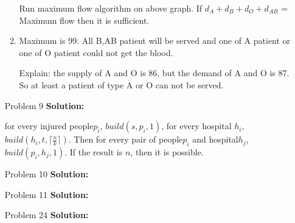 \normalfont\documentclass[letterpaper,11pt]{article}
\begin{document}
\begin{enumerate}
\begin{enumerate}
	Run maximum flow algorithm on above graph. If $d_A+d_B+d_O+d_{AB}$ = Maximum flow then it is sufficient.
	\item
		Maximum is 99. All B,AB patient will be served and one of A patient or one of O patient could not get the blood.\par
		Explain:
		the supply of A and O is 86, but the demand of A and O is 87. So at least a patient of type A or O can not be served.
	\end{enumerate}
\item [Problem 9]\textbf{Solution:}\par
	for every injured people$p_i$, $build(s,p_i,1)$, for every hospital $h_i$, $build(h_i,t,\lceil \frac{n}{k}\rceil)$. Then for every pair of people$p_i$ and hospital$h_j$, $build(p_i,h_j,1)$.
	If the result is $n$, then it is possible.
\item [Problem 10]\textbf{Solution:}\par
\item [Problem 11]\textbf{Solution:}\par
\item [Problem 24]\textbf{Solution:}\par
\end{enumerate}
\end{document}
